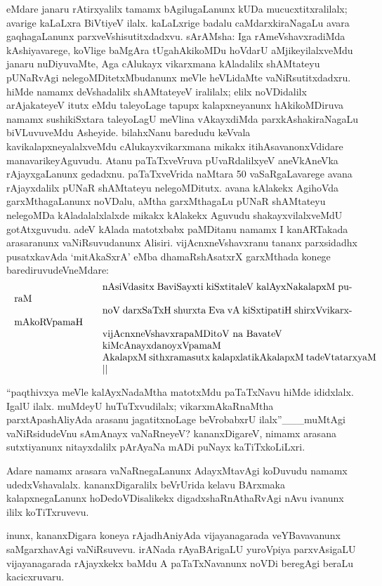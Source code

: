 \documentclass[11pt,a4size]{article}
\begin{document}
eMdare janaru rAtirxyalilx tamamx bAgilugaLanunx kUDa
mucucxtitxralilalx; avarige kaLaLxra BiVtiyeV ilalx. kaLaLxrige badalu
caMdarxkiraNagaLu avara gaqhagaLanunx
parxveVshisutitxdadxvu. sArAMsha: Iga rAmeVshavxradiMda kAshiyavarege,
koVlige baMgAra tUgahAkikoMDu hoVdarU aMjikeyilalxveMdu janaru
nuDiyuvaMte, Aga cAlukayx vikarxmana kAladalilx shAMtateyu pUNaRvAgi
nelegoMDitetxMbudanunx meVle heVLidaMte vaNiRsutitxdadxru. hiMde
namamx deVshadalilx shAMtateyeV iralilalx; elilx noVDidalilx
arAjakateyeV itutx eMdu taleyoLage tapupx kalapxneyanunx hAkikoMDiruva
namamx sushikiSxtara taleyoLagU meVlina vAkayxdiMda
parxkAshakiraNagaLu biVLuvuveMdu Asheyide. bilahxNanu baredudu keVvala
kavikalapxneyalalxveMdu cAlukayxvikarxmana mikakx itihAsavanonxVdidare
manavarikeyAguvudu. Atanu paTaTxveVruva pUvaRdalilxyeV aneVkAneVka
rAjayxgaLanunx gedadxnu. paTaTxveVrida naMtara 50 vaSaRgaLavarege
avana rAjayxdalilx pUNaR shAMtateyu nelegoMDitutx. avana kAlakekx
AgihoVda garxMthagaLanunx noVDalu, aMtha garxMthagaLu pUNaR shAMtateyu
nelegoMDa kAladalalxlalxde mikakx kAlakekx Aguvudu shakayxvilalxveMdU
gotAtxguvudu. adeV kAlada matotxbabx paMDitanu namamx I kanARTakada
arasaranunx vaNiRsuvudanunx Alisiri. vijAcnxneVshavxranu tananx
parxsidadhx pusatxkavAda `mitAkaSxrA' eMba dhamaRshAsatxrX garxMthada
konege barediruvudeVneMdare:
$$
\vbox{\parskip=0pt\parindent=0pt \everypar{\hskip9em} \obeylines
nAsiVdasitx BaviSayxti kiSxtitaleV kalAyxNakalapxM puraM
noV darxSaTxH shurxta Eva vA kiSxtipatiH shirxVvikarxmAkoRVpamaH
vijAcnxneVshavxrapaMDitoV\index{vijAcnxneVshavxra} na BavateV kiMcAnayxdanoyxVpamaM
AkalapxM sithxramasutx kalapxlatikAkalapxM tadeVtatarxyaM ||}
$$

``paqthivxya meVle kalAyxNadaMtha matotxMdu paTaTxNavu hiMde
ididxlalx. IgalU ilalx. muMdeyU huTuTxvudilalx; vikarxmAkaRnaMtha
parxtApashAliyAda arasanu jagatitxnoLage beVrobabxrU
ilalx''\_\_\_muMtAgi vaNiRsidudeVnu sAmAnayx vaNaRneyeV?
kananxDigareV, nimamx arasana sutxtiyanunx nitayxdalilx pArAyaNa mADi
puNayx kaTiTxkoLiLxri.

Adare namamx arasara vaNaRnegaLanunx AdayxMtavAgi koDuvudu namamx
udedxVshavalalx. kananxDigaralilx beVrUrida kelavu BArxmaka
kalapxnegaLanunx hoDedoVDisalikekx digadxshaRnAthaRvAgi nAvu ivanunx
ililx koTiTxruvevu.

inunx, kananxDigara koneya rAjadhAniyAda vijayanagarada veYBavavanunx
saMgarxhavAgi vaNiRsuvevu. irANada rAyaBArigaLU yuroVpiya parxvAsigaLU
vijayanagarada rAjayxkekx baMdu A paTaTxNavanunx noVDi beregAgi beraLu
kacicxruvaru.
\end{document}
